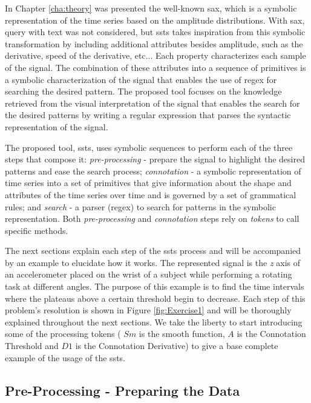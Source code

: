 In Chapter \ref{cha:theory} was presented the well-known \gls{sax}, which is a symbolic representation of the time series based on the amplitude distributions. With \gls{sax}, query with text was not considered, but \gls{ssts} takes inspiration from this symbolic transformation by including additional attributes besides amplitude, such as the derivative, speed of the derivative, etc... Each property characterizes each sample of the signal. The combination of these attributes into a sequence of primitives is a symbolic characterization of the signal that enables the use of \gls{regex} for searching the desired pattern. The proposed tool focuses on the knowledge retrieved from the visual interpretation of the signal that enables the search for the desired patterns by writing a regular expression that parses the syntactic representation of the signal.
\par
The proposed tool, \gls{ssts}, uses symbolic sequences to perform each of the three steps that compose it: \textit{pre-processing} - prepare the signal to highlight the desired patterns and ease the search process; \textit{connotation} - a symbolic representation of time series into a set of primitives that give information about the shape and attributes of the time series over time and is governed by a set of grammatical rules; and \textit{search} - a parser (\gls{regex}) to search for patterns in the symbolic representation. Both \textit{pre-processing} and \textit{connotation} steps rely on \textit{tokens} to call specific methods.
\par
The next sections explain each step of the \gls{ssts} process and will be accompanied by an example to elucidate how it works. The represented signal is the \textit{z} axis of an accelerometer placed on the wrist of a subject while performing a rotating task at different angles. The purpose of this example is to find the time intervals where the plateaus above a certain threshold begin to decrease. Each step of this problem's resolution is shown in Figure \ref{fig:Exercise1} and will be thoroughly explained throughout the next sections. We take the liberty to start introducing some of the processing tokens ( $Sm$ is the smooth function, $A$ is the Connotation Threshold and $D1$ is the Connotation Derivative) to give a base complete example of the usage of the \gls{ssts}.


\subsection{Pre-Processing - Preparing the Data}

